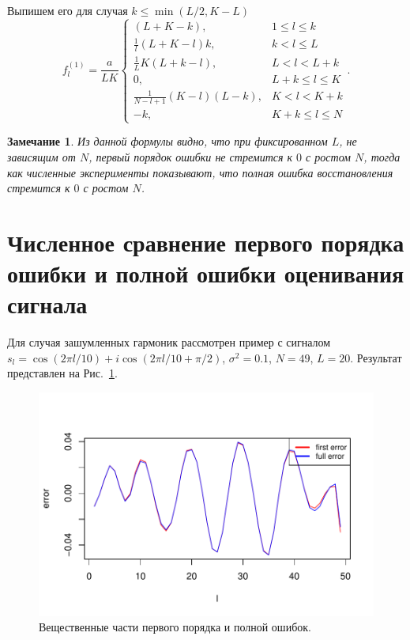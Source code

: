 \documentclass{spisok-article}
\newtheorem{remark}{Замечание}%
\begin{document}
Выпишем его для случая $k \leq \min(L/2, K - L)$
$$f^{(1)}_l = \frac{a}{{LK}}
\begin{cases}
	(L + K - k), & \text{$1 \leq l \leq k$}\\
	\frac{1}{l}(L + K - l)k, & \text{$k < l \leq L$}\\
	\frac{1}{L}K(L + k - l), &\text{$L < l < L + k$}\\
	0, &\text{$L + k \leq l \leq K$}\\
	\frac{1}{N - l + 1}(K - l)(L - k), &\text{$K < l < K + k$}\\
	-k, &\text{$K + k \leq l \leq N $}
\end{cases}.$$

\begin{remark}
Из данной формулы видно, что при фиксированном $L$, не зависящим от $N$, первый порядок ошибки не стремится к $0$ с ростом $N$, тогда как численные эксперименты показывают, что полная ошибка восстановления стремится к $0$ с ростом $N$. 
\end{remark}

\section{Численное сравнение первого порядка ошибки и полной ошибки оценивания сигнала}
\label{sec:results}
Для случая зашумленных гармоник рассмотрен пример с сигналом $s_l = \cos(2 \pi l / 10) + i\cos(2 \pi l / 10 + \pi/2)$, $\sigma^2 = 0.1$, $N = 49$, $L = 20$. Результат представлен на Рис.~\ref{fig:harm_noise}.

\begin{figure}[H]
	\begin{center}
		\includegraphics[width=0.8\linewidth]{img/first_vs_full_re.pdf}
		\caption{Вещественные части первого порядка и полной ошибок.}
		\label{fig:harm_noise}
	\end{center}
\end{figure}
\end{document}
